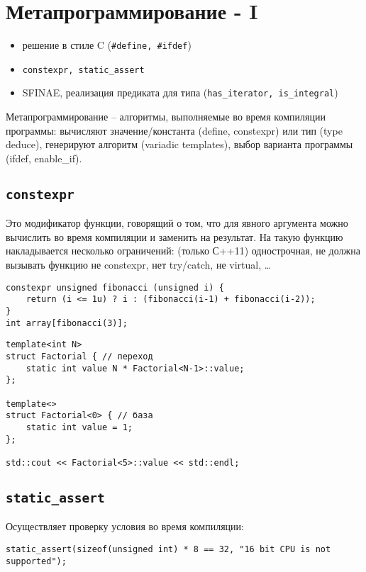 \section{Метапрограммирование - I}
\begin{itemize}[noitemsep]
	\item решение в стиле C (\texttt{\#define, \#ifdef})
	\item \texttt{constexpr, static\_assert}
	\item SFINAE, реализация предиката для типа (\texttt{has\_iterator, is\_integral})
\end{itemize}
Метапрограммирование -- алгоритмы, выполняемые во время компиляции программы: вычисляют значение/константа (define, constexpr) или тип (type deduce), генерируют  алгоритм (variadic templates), выбор варианта программы (ifdef, enable\_if).

\subsection{\texttt{constexpr}}
Это модификатор функции, говорящий о том, что для явного аргумента можно вычислить во время компиляции и заменить на результат. На такую функцию накладывается несколько ограничений: (только С++11) однострочная, не должна вызывать функцию не constexpr, нет try/catch, не virtual, \ldots 
\begin{verbatim}
constexpr unsigned fibonacci (unsigned i) {
	return (i <= 1u) ? i : (fibonacci(i-1) + fibonacci(i-2));
}
int array[fibonacci(3)];
\end{verbatim}
\begin{verbatim}
template<int N>
struct Factorial { // переход 
    static int value N * Factorial<N-1>::value;
};

template<>
struct Factorial<0> { // база 
    static int value = 1;
};

std::cout << Factorial<5>::value << std::endl;
\end{verbatim}

\subsection{\texttt{static\_assert}}
Осуществляет проверку условия во время компиляции:
\begin{verbatim}
static_assert(sizeof(unsigned int) * 8 == 32, "16 bit CPU is not supported");
\end{verbatim}

